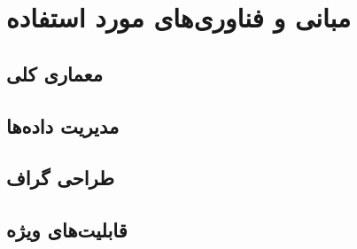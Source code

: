 \chapter{مبانی و فناوری‌های مورد استفاده}
{}

\section{معماری کلی}
\section{مدیریت داده‌ها}
\section{طراحی گراف}
\section{قابلیت‌های ویژه}
